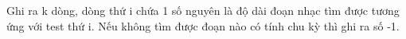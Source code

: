 Ghi ra k dòng, dòng thứ i chứa 1 số nguyên là độ dài đoạn nhạc tìm được tương ứng với test thứ i. Nếu không tìm được đoạn nào có tính chu kỳ thì ghi ra số -1.